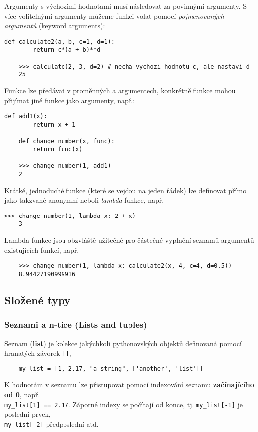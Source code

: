 Argumenty s výchozími hodnotami musí následovat za povinnými argumenty. S více volitelnými argumenty můžeme funkci volat pomocí \emph{pojmenovaných argumentů} (keyword arguments):
\begin{lstlisting}[caption=Volitelné a pojmenované argumenty.]
    def calculate2(a, b, c=1, d=1):
        return c*(a + b)**d

    >>> calculate(2, 3, d=2) # necha vychozi hodnotu c, ale nastavi d
    25
\end{lstlisting}

Funkce lze předávat v proměnných a argumentech, konkrétně funkce mohou přijímat jiné funkce jako argumenty, např.:
\begin{lstlisting}[caption=Funkce vyššího řádu.]
    def add1(x):
        return x + 1

    def change_number(x, func):
        return func(x)

    >>> change_number(1, add1)
    2
\end{lstlisting}

Krátké, jednoduché funkce (které se vejdou na jeden řádek) lze definovat přímo jako takzvané anonymní neboli \emph{lambda} funkce, např.
\begin{lstlisting}[caption=Lambda funkce.]
    >>> change_number(1, lambda x: 2 + x)
    3
\end{lstlisting}
Lambda funkce jsou obzvláště užitečné pro částečné vyplnění seznamů argumentů existujících funkcí, např.
\begin{lstlisting}
    >>> change_number(1, lambda x: calculate2(x, 4, c=4, d=0.5))
    8.94427190999916
\end{lstlisting}

\subsection{Složené typy}

\subsubsection{Seznami a n-tice (Lists and tuples)}
Seznam (\textbf{list}) je kolekce jakýchkoli pythonovských objektů definovaná pomocí hranatých závorek \verb|[]|,
\begin{lstlisting}
    my_list = [1, 2.17, "a string", ['another', 'list']]
\end{lstlisting}
K hodnotám v seznamu lze přistupovat pomocí indexování seznamu \textbf{začínajícího od 0}, např.\\\verb|my_list[1] == 2.17|. Záporné indexy se počítají od konce, tj. \verb|my_list[-1]| je poslední prvek,\\\verb|my_list[-2]| předposlední atd.

